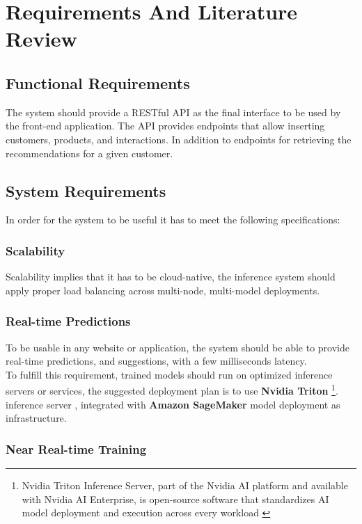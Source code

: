 \chapter{Requirements And Literature Review}
\minitoc 

\section{Functional Requirements}

The system should provide a RESTful API as the final interface to be used by the front-end application.
The API provides endpoints that allow inserting customers, products, and interactions. In addition to endpoints for retrieving the recommendations for a given customer.

\section{System Requirements}

In order for the system to be useful it has to meet the following specifications:

\subsection{Scalability}
Scalability implies that it has to be cloud-native, the inference system should apply proper load balancing across multi-node, multi-model deployments.

\subsection{Real-time Predictions}
To be usable in any website or application, the system should be able to provide real-time predictions, and suggestions, with a few milliseconds latency. \\

To fulfill this requirement, trained models should run on optimized inference servers or services, the suggested deployment plan is to use
\textbf{Nvidia Triton}
\footnote{Nvidia Triton Inference Server, part of the Nvidia AI platform and available with Nvidia AI Enterprise, is open-source software that standardizes AI model deployment and execution across every workload \cite{Triton}}. 
inference server \cite{Triton}, 
integrated with \textbf{Amazon SageMaker} model deployment \cite{SageMaker} as infrastructure.

\subsection{Near Real-time Training}

